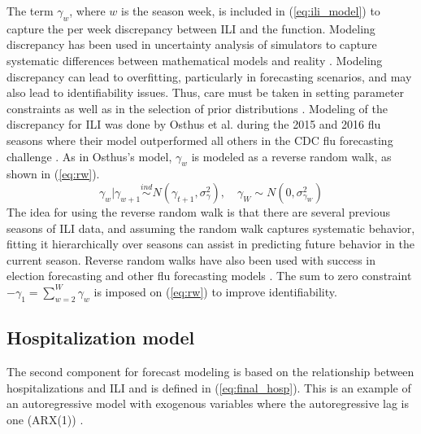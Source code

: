 The term $\gamma_w$, where $w$ is the season week, is included in 
(\ref{eq:ili_model}) to capture the per week discrepancy between ILI and the 
function. Modeling discrepancy has been used in uncertainty analysis of 
simulators to capture systematic differences between mathematical models and 
reality \cite[]{ma2022multifidelity,brynjarsdottir2014learning,
arendt2012improving,kennedy2001bayesian}. Modeling discrepancy can lead to 
overfitting, particularly in forecasting scenarios, and may also lead to 
identifiability issues. 
Thus, care must be taken in setting parameter constraints as well as in the 
selection of prior distributions \cite[]{osthus2019dynamic,
brynjarsdottir2014learning}. 
Modeling of the discrepancy for ILI was done by Osthus et al. during the 2015 
and 2016 flu seasons where their model outperformed all others in the CDC flu 
forecasting challenge \cite[]{osthus2019dynamic}. As in Osthus's model, 
$\gamma_w$ is modeled as a reverse random walk, as shown in (\ref{eq:rw}). 
\begin{equation}
    \label{eq:rw}
        \gamma_w|\gamma_{w + 1} \overset{ind}{\sim} N(\gamma_{t+1},\sigma^2_{\gamma}), \quad
        \gamma_{W} \sim N(0,\sigma^2_{\gamma_W})
\end{equation}
The idea for using the reverse random walk is that there are several previous 
seasons of ILI data, and assuming the random walk captures systematic behavior, 
fitting it hierarchically over seasons can assist in predicting future behavior 
in the current season. 
Reverse random walks have also been used with success in election forecasting 
and other flu forecasting models \cite[]{osthus2021multiscale, 
osthus2019dynamic, linzer2013dynamic}. The sum to zero constraint 
$-\gamma_1 = \sum_{w=2}^W \gamma_w$ is imposed on (\ref{eq:rw}) to improve 
identifiability. 









\subsection{Hospitalization model} \label{sec:hospital_model}

The second component for forecast modeling is based on the relationship between 
hospitalizations and ILI and is defined in (\ref{eq:final_hosp}).
This is an example of an autoregressive model with exogenous variables where 
the autoregressive lag is one (ARX(1)) 
\cite[]{raftery2010online,ljung1987system}. 


